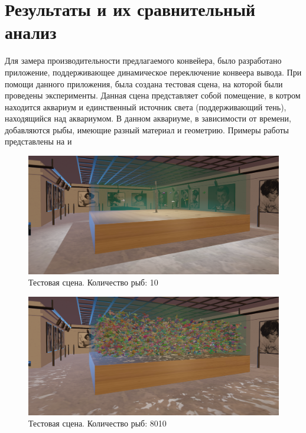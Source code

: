 \chapter{Результаты и их сравнительный анализ} \label{ch4}


	Для замера производительности предлагаемого конвейера, было разработано приложение, поддерживающее динамическое переключение конвеера вывода. При помощи данного приложения, была создана тестовая сцена, на которой были проведены эксперименты. Данная сцена представляет собой помещение, в котром находится аквариум и единственный источник света (поддерживающий тень), находящийся над аквариумом. В данном аквариуме, в зависимости от времени, добавляются рыбы, имеющие разный материал и геометрию. Примеры работы представлены на  и  
	
	\begin{figure}[ht!] 
		\center
		\includegraphics [scale=0.4] {my_folder/images//empty_aquarium}	
		\caption{Тестовая сцена. Количество рыб: 10} 
		\label{fig:empty_aquarium}
	\end{figure}
	
	\begin{figure}[ht!] 
		\center
		\includegraphics [scale=0.4] {my_folder/images//full_aquarium}	
		\caption{Тестовая сцена. Количество рыб: 8010} 
		\label{fig:full_aquarium}
	\end{figure}
	
